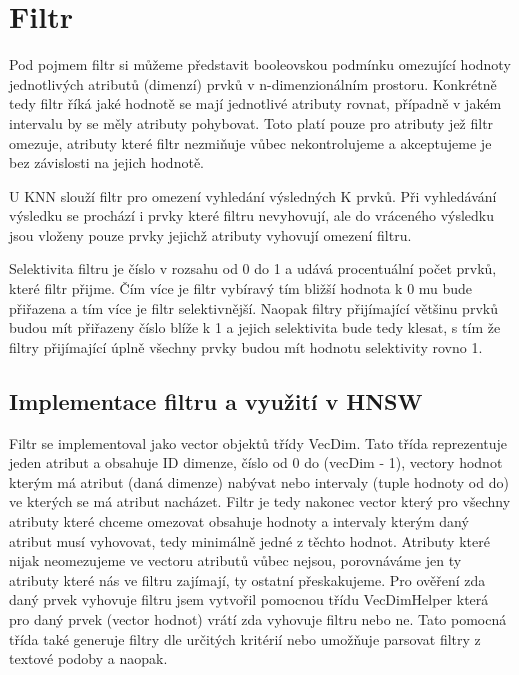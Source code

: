 \documentclass[czech,semestral,dept460,male,csharp,cpdeclaration]{diploma}
\begin{document}
	\chapter{Filtr}
	\label{chap_filtr}
	
		Pod pojmem filtr si můžeme představit booleovskou podmínku omezující hodnoty jednotlivých atributů (dimenzí) prvků v n-dimenzionálním prostoru. Konkrétně tedy filtr říká jaké hodnotě se mají jednotlivé atributy rovnat, případně v jakém intervalu by se měly atributy pohybovat. Toto platí pouze pro atributy jež filtr omezuje, atributy které filtr nezmiňuje vůbec nekontrolujeme a akceptujeme je bez závislosti na jejich hodnotě.
		
		U KNN slouží filtr pro omezení vyhledání výsledných K prvků. Při vyhledávání výsledku se prochází i prvky které filtru nevyhovují, ale do vráceného výsledku jsou vloženy pouze prvky jejichž atributy vyhovují omezení filtru.
		
		Selektivita filtru \cite{OptINFORMIX} je číslo v rozsahu od 0 do 1 a udává procentuální počet prvků, které filtr přijme. Čím více je filtr vybíravý tím bližší hodnota k 0 mu bude přiřazena a tím více je filtr selektivnější. Naopak filtry přijímající většinu prvků budou mít přiřazeny číslo blíže k 1 a jejich selektivita bude tedy klesat, s tím že filtry přijímající úplně všechny prvky budou mít hodnotu selektivity rovno 1.
		
		\section{Implementace filtru a využití v HNSW}
		
		Filtr se implementoval jako vector objektů třídy VecDim. Tato třída reprezentuje jeden atribut a obsahuje ID dimenze, číslo od 0 do (vecDim - 1), vectory hodnot kterým má atribut (daná dimenze) nabývat nebo intervaly (tuple hodnoty od do) ve kterých se má atribut nacházet. Filtr je tedy nakonec vector který pro všechny atributy které chceme omezovat obsahuje hodnoty a intervaly kterým daný atribut musí vyhovovat, tedy minimálně jedné z těchto hodnot. Atributy které nijak neomezujeme ve vectoru atributů vůbec nejsou, porovnáváme jen ty atributy které nás ve filtru zajímají, ty ostatní přeskakujeme. Pro ověření zda daný prvek vyhovuje filtru jsem vytvořil pomocnou třídu VecDimHelper která pro daný prvek (vector hodnot) vrátí zda vyhovuje filtru nebo ne. Tato pomocná třída také generuje filtry dle určitých kritérií nebo umožňuje parsovat filtry z textové podoby a naopak.
		
\end{document}
